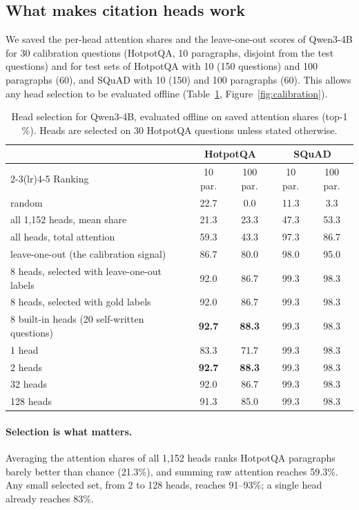 \documentclass[11pt]{article}
\newcommand{\best}[1]{\textbf{#1}}
\begin{document}
\subsection{What makes citation heads work}
\label{sec:ablations}

We saved the per-head attention shares and the leave-one-out scores of Qwen3-4B for 30 calibration questions (HotpotQA, 10 paragraphs, disjoint from the test questions) and for test sets of HotpotQA with 10 (150 questions) and 100 paragraphs (60), and SQuAD with 10 (150) and 100 paragraphs (60). This allows any head selection to be evaluated offline (Table~\ref{tab:ablation}, Figure~\ref{fig:calibration}).

\begin{table}[t]
\centering
\small
\caption{Head selection for Qwen3-4B, evaluated offline on saved attention shares (top-1 \%). Heads are selected on 30 HotpotQA questions unless stated otherwise.}
\label{tab:ablation}
\begin{tabular}{lcccc}
\toprule
& \multicolumn{2}{c}{HotpotQA} & \multicolumn{2}{c}{SQuAD} \\
\cmidrule(lr){2-3}\cmidrule(lr){4-5}
Ranking & 10 par. & 100 par. & 10 par. & 100 par. \\
\midrule
random & 22.7 & 0.0 & 11.3 & 3.3 \\
all 1{,}152 heads, mean share & 21.3 & 23.3 & 47.3 & 53.3 \\
all heads, total attention & 59.3 & 43.3 & 97.3 & 86.7 \\
leave-one-out (the calibration signal) & 86.7 & 80.0 & 98.0 & 95.0 \\
\midrule
8 heads, selected with leave-one-out labels & 92.0 & 86.7 & 99.3 & 98.3 \\
8 heads, selected with gold labels & 92.0 & 86.7 & 99.3 & 98.3 \\
8 built-in heads (20 self-written questions) & \best{92.7} & \best{88.3} & 99.3 & 98.3 \\
\midrule
1 head & 83.3 & 71.7 & 99.3 & 98.3 \\
2 heads & \best{92.7} & \best{88.3} & 99.3 & 98.3 \\
32 heads & 92.0 & 86.7 & 99.3 & 98.3 \\
128 heads & 91.3 & 85.0 & 99.3 & 98.3 \\
\bottomrule
\end{tabular}
\end{table}

\paragraph{Selection is what matters.} Averaging the attention shares of all 1{,}152 heads ranks HotpotQA paragraphs barely better than chance (21.3\%), and summing raw attention reaches 59.3\%. Any small selected set, from 2 to 128 heads, reaches 91--93\%; a single head already reaches 83\%.
\end{document}
